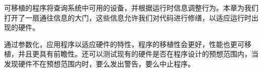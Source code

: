 
可移植的程序将查询系统中可用的设备，并根据运行时信息调整行为。本章为我们打开了一扇通往信息的大门，这些信息允许我们对代码进行修缮，以适应运行时出现的硬件。\par

通过参数化，应用程序以适应硬件的特性，程序的移植性会更好，性能也更可移植，并且更具有前瞻性。还可以测试现有的硬件是否在程序设计的预想范围内，当发现硬件不在预想范围内时，要么发出警告，要么中止程序。\par




\newpage